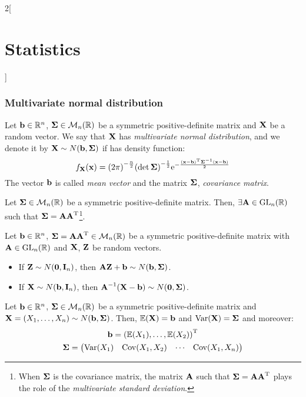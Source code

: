 \documentclass[../../../main_math.tex]{subfiles}
\begin{document}
\begin{multicols}{2}[\section{Statistics}]
  \subsubsection{Multivariate normal distribution}
  \begin{definition}
    Let $\vf{b}\in\RR^n$, $\vf{\Sigma}\in\mathcal{M}_n(\RR)$ be a symmetric positive-definite matrix and $\vf{X}$ be a random vector. We say that $\vf{X}$ has \emph{multivariate normal distribution}, and we denote it by $\vf{X}\sim N(\vf{b},\vf\Sigma)$ if has density function:
    $$f_{\vf{X}}(\vf{x})={(2\pi)}^{-\frac{n}{2}}{(\det\vf\Sigma)}^{-\frac{1}{2}}\exp{-\frac{\transpose{(\vf{x}-\vf{b})}{\vf\Sigma}^{-1}(\vf{x}-\vf{b})}{2}}$$
    The vector $\vf{b}$ is called \emph{mean vector} and the matrix $\vf\Sigma$, \emph{covariance matrix}.
  \end{definition}
  \begin{proposition}
    Let $\vf{\Sigma}\in\mathcal{M}_n(\RR)$ be a symmetric positive-definite matrix. Then, $\exists\vf{A}\in\GL_n(\RR)$ such that $\vf\Sigma=\vf{A}\transpose{\vf{A}}$\footnote{When $\vf\Sigma$ is the covariance matrix, the matrix $\vf{A}$ such that $\vf\Sigma=\vf{A}\transpose{\vf{A}}$ plays the role of the \emph{multivariate standard deviation}.}.
  \end{proposition}
  \begin{proposition}
    Let $\vf{b}\in\RR^n$, $\vf\Sigma=\vf{A}\transpose{\vf{A}}\in\mathcal{M}_n(\RR)$ be a symmetric positive-definite matrix with $\vf{A}\in\GL_n(\RR)$ and $\vf{X}$, $\vf{Z}$ be random vectors.
    \begin{itemize}
      \item If $\vf{Z}\sim N(\vf{0},\vf{I}_n)$, then $\vf{AZ}+\vf{b}\sim N(\vf{b},\vf\Sigma)$.
      \item If $\vf{X}\sim N(\vf{b},\vf{I}_n)$, then ${\vf{A}}^{-1}(\vf{X}-\vf{b})\sim N(\vf{0},\vf\Sigma)$.
    \end{itemize}
  \end{proposition}
  \begin{proposition}
    Let $\vf{b}\in\RR^n$, $\vf{\Sigma}\in\mathcal{M}_n(\RR)$ be a symmetric positive-definite matrix and $\vf{X}=(X_1,\ldots,X_n)\sim N(\vf{b},\vf\Sigma)$. Then, $\Exp(\vf{X})=\vf{b}$ and $\Var(\vf{X})=\vf\Sigma$ and moreover:
    \begin{gather*}
      \vf{b}=\transpose{(\Exp(X_1),\ldots,\Exp(X_2))}\\
      \vf\Sigma=
      \begin{pmatrix}
        \Var(X_1)     & \cov(X_1,X_2) & \cdots & \cov(X_1,X_n) \\

\end{pmatrix}
\end{gather*}
\end{proposition}
\end{multicols}
\end{document}
